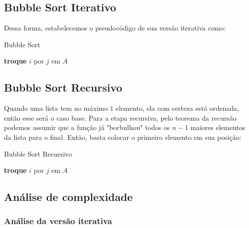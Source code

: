\subsection{Bubble Sort Iterativo}

Dessa forma, estabelecemos o pseudocódigo de sua versão iterativa como:

\begin{algorithm}
	\caption{Bubble Sort}
	\label{algo:bubble_sort_it}
	\begin{algorithmic}[1]
		\Statex
		\State \textbf{troque} $i$ por $j$ em $A$
		\EndIf
		\EndFor
		\EndFor
		\EndFunction
	\end{algorithmic}
\end{algorithm}
\FloatBarrier

\subsection{Bubble Sort Recursivo}

Quando uma lista tem no máximo $1$ elemento, ela com certeza está ordenada, então esse será o caso base. Para a etapa recursiva, pelo teorema da recursão podemos assumir que a função já "borbulhou" todos os $n - 1$ maiores elementos da lista para o final. Então, basta colocar o primeiro elemento em sua posição:

\begin{algorithm}
	\caption{Bubble Sort Recursivo}
	\label{algo:bubble_sort_recursivo}
	\begin{algorithmic}[1]
		\Statex
		\Return{}
		\EndIf
		\State \textbf{troque} $i$ por $j$ em $A$
		\EndIf
		\EndFor
		\State {}
		\EndFunction
	\end{algorithmic}
\end{algorithm}
\FloatBarrier

\subsection{Análise de complexidade}

\subsubsection{Análise da versão iterativa}


